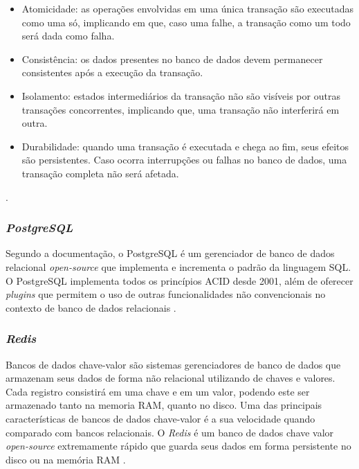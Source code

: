 \begin{itemize}
    \item Atomicidade: as operações envolvidas em uma única transação são executadas como uma só, implicando em que, caso uma falhe, a transação como um todo será dada como falha.
    \item Consistência: os dados presentes no banco de dados devem permanecer consistentes após a execução da transação.
    \item Isolamento: estados intermediários da transação não são visíveis por outras transações concorrentes, implicando que, uma transação não interferirá em outra.
    \item Durabilidade: quando uma transação é executada e chega ao fim, seus efeitos são persistentes. Caso ocorra interrupções ou falhas no banco de dados, uma transação completa não será afetada.
\end{itemize}

\cite{yu2009acid}.

\subsubsection{\textit{PostgreSQL}}

Segundo a documentação, o PostgreSQL é um gerenciador de banco de dados relacional \textit{open-source} que implementa e incrementa o padrão da linguagem SQL. O PostgreSQL implementa todos os princípios ACID desde 2001, além de oferecer \textit{plugins} que permitem o uso de outras funcionalidades não convencionais no contexto de banco de dados relacionais \cite{postgresql_about}.

\subsubsection{\textit{Redis}}

Bancos de dados chave-valor são sistemas gerenciadores de banco de dados que armazenam seus dados de forma não relacional utilizando de chaves e valores. Cada registro consistirá em uma chave e em um valor, podendo este ser armazenado tanto na memoria RAM, quanto no disco. Uma das principais características de bancos de dados chave-valor é a sua velocidade quando comparado com bancos relacionais. O \textit{Redis} é um banco de dados chave valor \textit{open-source} extremamente rápido que guarda seus dados em forma persistente no disco ou na memória RAM \cite{redis-in-action}.

